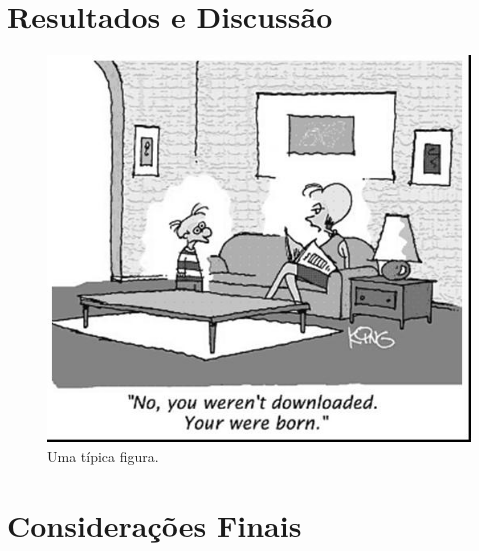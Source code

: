 \documentclass[12pt]{article}
\begin{document}
\section{Resultados e Discussão}
	\begin{figure}[h]
		\centering
		\includegraphics[scale=0.2]{fig1.jpg}
		\caption{Uma típica figura.}
		\label{fig1}
	\end{figure}

\section{Considerações Finais}

\cite{SILVA:2017}



\end{document}
